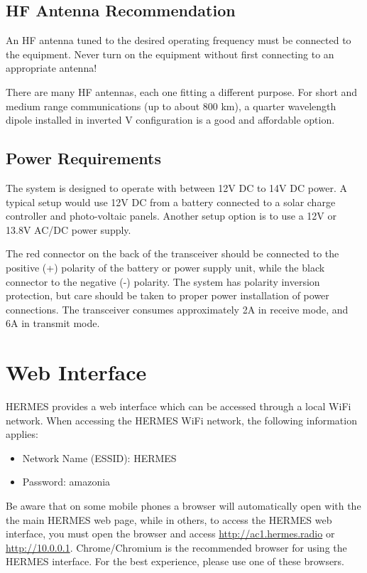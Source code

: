 \subsection{HF Antenna Recommendation}

An HF antenna tuned to the desired operating frequency must be connected to the equipment. Never turn on the equipment without first connecting to an appropriate antenna!

There are many HF antennas, each one fitting a different purpose. For short and medium range communications (up to about 800 km), a quarter wavelength dipole installed in inverted V configuration is a good and affordable option. %

\subsection{Power Requirements}

The system is designed to operate with between 12V DC to 14V DC power. A typical setup would use 12V DC from a battery connected to a solar charge controller and photo-voltaic panels. Another setup option is to use a 12V or 13.8V AC/DC power supply. 

The red connector on the back of the transceiver should be connected to the positive (+) polarity of the battery or power supply unit, while the black connector to the negative (-) polarity. The system has polarity inversion protection, but care should be taken to proper power installation of power connections. The transceiver consumes approximately 2A in receive mode, and 6A in transmit mode. %

\section{Web Interface}

HERMES provides a web interface which can be accessed through a local WiFi network. When accessing the HERMES WiFi network, the following information applies:
\begin{itemize}
    \item Network Name (ESSID): HERMES
    \item Password: amazonia
\end{itemize}

Be aware that on some mobile phones a browser will automatically open with the the main HERMES web page, while in others, to access the HERMES web interface, you must open the browser and access \url{http://ac1.hermes.radio} or \url{http://10.0.0.1}. 
\linebreak
\linebreak
Chrome/Chromium is the recommended browser for using the HERMES interface. For the best experience, please use one of these browsers.

